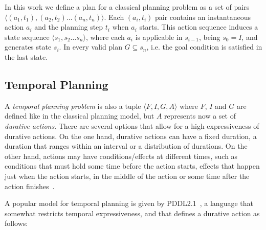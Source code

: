 \documentclass[runningheads]{llncs}
\newcommand{\tup}[1]{{\langle #1 \rangle}}
\begin{document}
In this work we define a plan for a classical planning problem as a set of pairs $\tup{(a_1,t_1),(a_2,t_2)\ldots (a_n,t_n)}$. Each $(a_i,t_i)$ pair contains an instantaneous action $a_i$ and the planning step $t_i$ when $a_i$ starts. This action sequence induces a state sequence $\tup{s_1,s_2\ldots s_n}$, where each $a_i$ is applicable in $s_{i-1}$, being $s_0=I$, and generates state $s_i$. In every valid plan $G\subseteq s_n$, i.e. the goal condition is satisfied in the last state. %

\subsection{Temporal Planning}
\label{sec:temporalplanning}

A {\em temporal planning problem} is also a tuple $\tup{F,I,G,A}$ where $F$, $I$ and $G$ are defined like in the classical planning model, but $A$ represents now a set of {\em durative actions}. There are several options that allow for a high expressiveness of durative actions. On the one hand, durative actions can have a fixed duration, a duration that ranges within an interval or a distribution of durations. On the other hand, actions may have conditions/effects at different times, such as conditions that must hold some time before the action starts, effects that happen just when the action starts, in the middle of the action or some time after the action finishes~\cite{garrido2009constraint}.

A popular model for temporal planning is given by PDDL2.1~\cite{fox2003pddl2}, a language that somewhat restricts temporal expressiveness, and that defines a durative action as follows:
\end{document}
